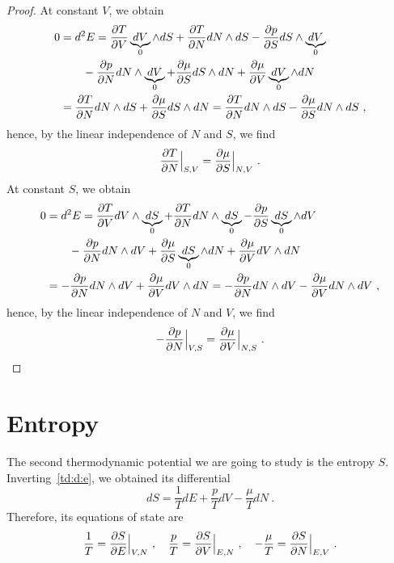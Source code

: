 \begin{proof}
        At constant $V$, we obtain
        \begin{equation*}
        \begin{aligned}
            0 & = d^2 E = \frac{\partial T}{\partial V} \underbrace{dV}_0 \wedge dS + \frac{\partial T}{\partial N} dN \wedge dS - \frac{\partial p}{\partial S} dS \wedge \underbrace{dV}_0 \\ & \qquad - \frac{\partial p}{\partial N} dN \wedge \underbrace{dV}_0 + \frac{\partial\mu}{\partial S} dS \wedge dN + \frac{\partial\mu}{\partial V} \underbrace{dV}_0 \wedge dN \\ & = \frac{\partial T}{\partial N} dN \wedge dS + \frac{\partial\mu}{\partial S} dS \wedge dN = \frac{\partial T}{\partial N} dN \wedge dS - \frac{\partial\mu}{\partial S} dN \wedge dS~,
        \end{aligned}
        \end{equation*}
        hence, by the linear independence of $N$ and $S$, we find
        \begin{equation*}
            \frac{\partial T}{\partial N} \Big \vert_{S,V} = \frac{\partial\mu}{\partial S} \Big \vert_{N, V} ~.
        \end{equation*}
        At constant $S$, we obtain
        \begin{equation*}
        \begin{aligned}
            0 & = d^2 E = \frac{\partial T}{\partial V} dV \wedge \underbrace{dS}_0 + \frac{\partial T}{\partial N} dN \wedge \underbrace{dS}_0 - \frac{\partial p}{\partial S} \underbrace{dS}_0 \wedge dV \\ & \qquad - \frac{\partial p}{\partial N} dN \wedge dV + \frac{\partial\mu}{\partial S} \underbrace{dS}_0 \wedge dN + \frac{\partial\mu}{\partial V} dV \wedge dN \\ & = - \frac{\partial p}{\partial N} dN \wedge dV + \frac{\partial\mu}{\partial V} dV \wedge dN = - \frac{\partial p}{\partial N} dN \wedge dV - \frac{\partial\mu}{\partial V} dN \wedge dV ~,
        \end{aligned}
        \end{equation*}
        hence, by the linear independence of $N$ and $V$, we find
        \begin{equation*}
            - \frac{\partial p}{\partial N} \Big \vert_{V,S} = \frac{\partial\mu}{\partial V} \Big \vert_{N, S} ~.
        \end{equation*}
    \end{proof}

\section{Entropy}

    The second thermodynamic potential we are going to study is the entropy $S$. Inverting~\eqref{td:d:e}, we obtained its differential
    \begin{equation}\label{td:d:s}
        dS = \frac{1}{T} dE + \frac{p}{T} dV - \frac{\mu}{T} dN ~.
    \end{equation}
    Therefore, its equations of state are 
    \begin{equation}\label{td:es:s}
        \frac{1}{T} = \frac{\partial S}{\partial E} \Big \vert_{V, N} ~, \quad \frac{p}{T} = \frac{\partial S}{\partial V} \Big \vert_{E, N} ~, \quad - \frac{\mu}{T} = \frac{\partial S}{\partial N} \Big \vert_{E, V} ~.
    \end{equation}

